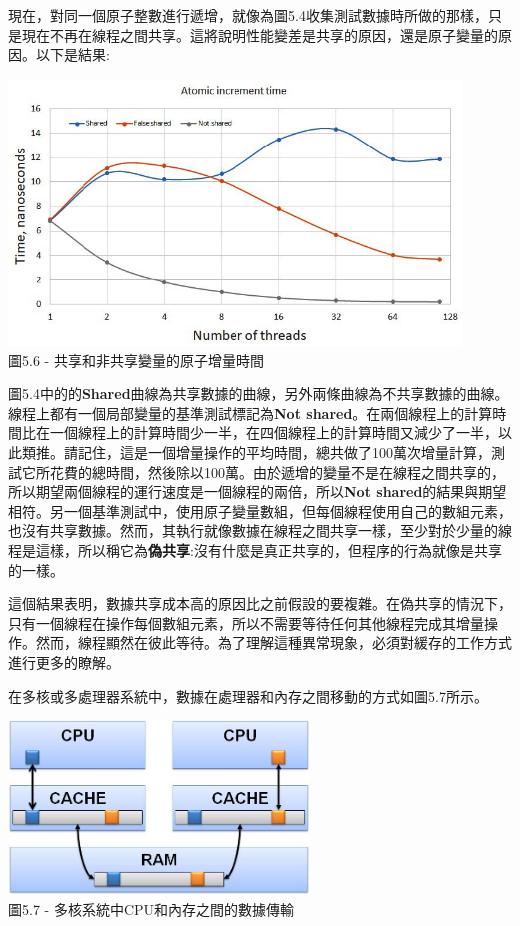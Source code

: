 現在，對同一個原子整數進行遞增，就像為圖5.4收集測試數據時所做的那樣，只是現在不再在線程之間共享。這將說明性能變差是共享的原因，還是原子變量的原因。以下是結果:

\begin{center}
\includegraphics[width=0.9\textwidth]{content/1/chapter5/images/6.jpg}\\
圖5.6 - 共享和非共享變量的原子增量時間
\end{center}

圖5.4中的的\textbf{Shared}曲線為共享數據的曲線，另外兩條曲線為不共享數據的曲線。線程上都有一個局部變量的基準測試標記為\textbf{Not shared}。在兩個線程上的計算時間比在一個線程上的計算時間少一半，在四個線程上的計算時間又減少了一半，以此類推。請記住，這是一個增量操作的平均時間，總共做了100萬次增量計算，測試它所花費的總時間，然後除以100萬。由於遞增的變量不是在線程之間共享的，所以期望兩個線程的運行速度是一個線程的兩倍，所以\textbf{Not shared}的結果與期望相符。另一個基準測試中，使用原子變量數組，但每個線程使用自己的數組元素，也沒有共享數據。然而，其執行就像數據在線程之間共享一樣，至少對於少量的線程是這樣，所以稱它為\textbf{偽共享}:沒有什麼是真正共享的，但程序的行為就像是共享的一樣。

這個結果表明，數據共享成本高的原因比之前假設的要複雜。在偽共享的情況下，只有一個線程在操作每個數組元素，所以不需要等待任何其他線程完成其增量操作。然而，線程顯然在彼此等待。為了理解這種異常現象，必須對緩存的工作方式進行更多的瞭解。

在多核或多處理器系統中，數據在處理器和內存之間移動的方式如圖5.7所示。

\begin{center}
\includegraphics[width=0.6\textwidth]{content/1/chapter5/images/7.jpg}\\
圖5.7 - 多核系統中CPU和內存之間的數據傳輸
\end{center}

